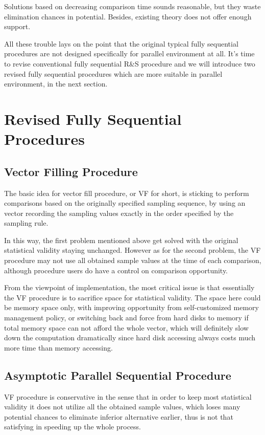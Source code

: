 \documentclass[12pt,a4paper]{report}
\begin{document}
Solutions based on decreasing comparison time sounds reasonable, but they waste elimination chances in potential. Besides, existing theory does not offer enough support.

All these trouble lays on the point that the original typical fully sequential procedures are not designed specifically for parallel environment at all. It's time to revise conventional fully sequential R\&S procedure and we will introduce two revised fully sequential procedures which are more suitable in parallel environment, in the next section.

\section{Revised Fully Sequential Procedures}

\subsection{Vector Filling Procedure}

The basic idea for vector fill procedure, or VF for short, is sticking to perform comparisons based on the originally specified sampling sequence, by using an vector recording the sampling values exactly in the order specified by the sampling rule.

In this way, the first problem mentioned above get solved with the original statistical validity staying unchanged. However as for the second problem, the VF procedure may not use all obtained sample values at the time of each comparison, although procedure users do have a control on comparison opportunity.

From the viewpoint of implementation, the most critical issue is that essentially the VF procedure is to sacrifice space for statistical validity. The space here could be memory space only, with improving opportunity from self-customized memory management policy, or switching back and force from hard disks to memory if total memory space can not afford the whole vector, which will definitely slow down the computation dramatically since hard disk accessing always costs much more time than memory accessing.

\subsection{Asymptotic Parallel Sequential Procedure}

VF procedure is conservative in the sense that in order to keep most statistical validity it does not utilize all the obtained sample values, which loses many potential chances to eliminate inferior alternative earlier, thus is not that satisfying in speeding up the whole process.
\end{document}
